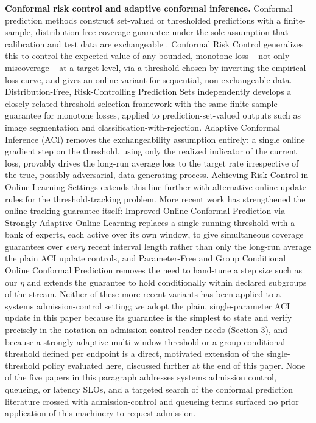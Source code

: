 \documentclass[11pt,letterpaper]{article}
\begin{document}
\textbf{Conformal risk control and adaptive conformal inference.} Conformal prediction methods construct set-valued or thresholded predictions with a finite-sample, distribution-free coverage guarantee under the sole assumption that calibration and test data are exchangeable \citep{Angelopoulos2021}. Conformal Risk Control \citep{Angelopoulos2022} generalizes this to control the expected value of any bounded, monotone loss -- not only miscoverage -- at a target level, via a threshold chosen by inverting the empirical loss curve, and gives an online variant for sequential, non-exchangeable data. Distribution-Free, Risk-Controlling Prediction Sets \citep{Bates2021} independently develops a closely related threshold-selection framework with the same finite-sample guarantee for monotone losses, applied to prediction-set-valued outputs such as image segmentation and classification-with-rejection. Adaptive Conformal Inference (ACI) \citep{Gibbs2021} removes the exchangeability assumption entirely: a single online gradient step on the threshold, using only the realized indicator of the current loss, provably drives the long-run average loss to the target rate irrespective of the true, possibly adversarial, data-generating process. Achieving Risk Control in Online Learning Settings \citep{Feldman2022} extends this line further with alternative online update rules for the threshold-tracking problem. More recent work has strengthened the online-tracking guarantee itself: Improved Online Conformal Prediction via Strongly Adaptive Online Learning \citep{Bhatnagar2023} replaces a single running threshold with a bank of experts, each active over its own window, to give simultaneous coverage guarantees over \textit{every} recent interval length rather than only the long-run average the plain ACI update controls, and Parameter-Free and Group Conditional Online Conformal Prediction \citep{Bharti2026} removes the need to hand-tune a step size such as our $\eta$ and extends the guarantee to hold conditionally within declared subgroups of the stream. Neither of these more recent variants has been applied to a systems admission-control setting; we adopt the plain, single-parameter ACI update in this paper because its guarantee is the simplest to state and verify precisely in the notation an admission-control reader needs (Section 3), and because a strongly-adaptive multi-window threshold or a group-conditional threshold defined per endpoint is a direct, motivated extension of the single-threshold policy evaluated here, discussed further at the end of this paper. None of the five papers in this paragraph addresses systems admission control, queueing, or latency SLOs, and a targeted search of the conformal prediction literature crossed with admission-control and queueing terms surfaced no prior application of this machinery to request admission.
\end{document}
